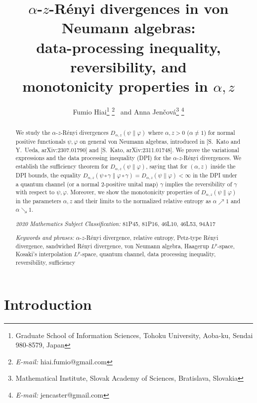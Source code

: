 \documentclass[12pt]{article}
\title{
$\alpha$-$z$-R\'enyi divergences in von Neumann algebras: \\
data-processing inequality, reversibility, and \\
monotonicity properties in $\alpha,z$}
\author{Fumio Hiai\footnote{Graduate School of Information Sciences, Tohoku University,
Aoba-ku, Sendai 980-8579, Japan}
\footnote{{\it E-mail:} hiai.fumio@gmail.com} \
and Anna Jen\v cov\'a\footnote{Mathematical Institute, Slovak Academy
of Sciences, Bratislava, Slovakia}
\footnote{{\it E-mail:} jencaster@gmail.com}}
\theoremstyle{definition}
\theoremstyle{remark}
\numberwithin{equation}{section}
\def\ffi{\varphi}
\begin{document}
\maketitle

\begin{abstract}
{We study the $\alpha$-$z$-R\'enyi divergences $D_{\alpha,z}(\psi\|\ffi)$ where $\alpha,z>0$ ($\alpha\ne1$)
for normal positive functionals $\psi,\ffi$ on general von Neumann
algebras, introduced in [S.~Kato and Y.~Ueda, arXiv:2307.01790] and [S.~Kato, arXiv:2311.01748].
We prove the variational expressions and the data processing inequality (DPI)
for the $\alpha$-$z$-R\'enyi divergences. We establish the sufficiency theorem for $D_{\alpha,z}(\psi\|\ffi)$,
saying that for $(\alpha,z)$ inside the DPI bounds, the equality
$D_{\alpha,z}(\psi\circ\gamma\|\ffi\circ\gamma)=D_{\alpha,z}(\psi\|\ffi)<\infty$ in the DPI under
a quantum channel (or a normal $2$-positive unital map) $\gamma$ implies the reversibility of
$\gamma$ with respect to $\psi,\ffi$. Moreover, we show the monotonicity properties of
$D_{\alpha,z}(\psi\|\ffi)$ in the parameters $\alpha,z$ and their limits to the normalized relative entropy as
$\alpha\nearrow1$ and $\alpha\searrow1$.}

\bigskip\noindent
{\it 2020 Mathematics Subject Classification:}
81P45, 81P16, 46L10, 46L53, 94A17

\medskip\noindent
{\it Keywords and phrases:}
$\alpha$-$z$-R\'enyi divergence,
relative entropy,
Petz-type R\'enyi divergence,
sandwiched R\'enyi divergence,
von Neumann algebra,
Haagerup $L^p$-space,
Kosaki's interpolation $L^p$-space,
quantum channel,
data processing inequality,
reversibility,
sufficiency

\end{abstract}

\tableofcontents


\section{Introduction}
\end{document}
